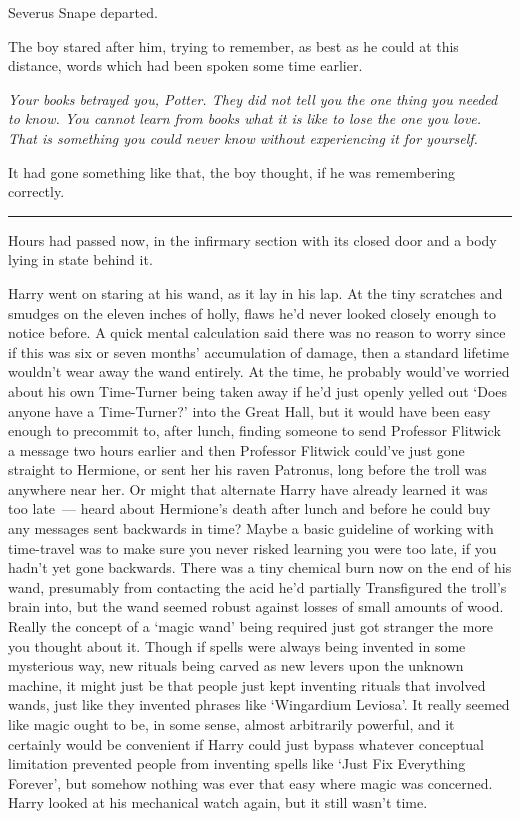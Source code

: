 Severus Snape departed.

The boy stared after him, trying to remember, as best as he could at this distance, words which had been spoken some time earlier.

\emph{Your books betrayed you, Potter. They did not tell you the one thing you needed to know. You cannot learn from books what it is like to lose the one you love. That is something you could never know without experiencing it for yourself.}

It had gone something like that, the boy thought, if he was remembering correctly.

\begin{center}\rule{3in}{0.4pt}\end{center}

Hours had passed now, in the infirmary section with its closed door and a body lying in state behind it.

Harry went on staring at his wand, as it lay in his lap. At the tiny scratches and smudges on the eleven inches of holly, flaws he'd never looked closely enough to notice before. A quick mental calculation said there was no reason to worry since if this was six or seven months' accumulation of damage, then a standard lifetime wouldn't wear away the wand entirely. At the time, he probably would've worried about his own Time-Turner being taken away if he'd just openly yelled out `Does anyone have a Time-Turner?' into the Great Hall, but it would have been easy enough to precommit to, after lunch, finding someone to send Professor Flitwick a message two hours earlier and then Professor Flitwick could've just gone straight to Hermione, or sent her his raven Patronus, long before the troll was anywhere near her. Or might that alternate Harry have already learned it was too late~--- heard about Hermione's death after lunch and before he could buy any messages sent backwards in time? Maybe a basic guideline of working with time-travel was to make sure you never risked learning you were too late, if you hadn't yet gone backwards. There was a tiny chemical burn now on the end of his wand, presumably from contacting the acid he'd partially Transfigured the troll's brain into, but the wand seemed robust against losses of small amounts of wood. Really the concept of a `magic wand' being required just got stranger the more you thought about it. Though if spells were always being invented in some mysterious way, new rituals being carved as new levers upon the unknown machine, it might just be that people just kept inventing rituals that involved wands, just like they invented phrases like `Wingardium Leviosa'. It really seemed like magic ought to be, in some sense, almost arbitrarily powerful, and it certainly would be convenient if Harry could just bypass whatever conceptual limitation prevented people from inventing spells like `Just Fix Everything Forever', but somehow nothing was ever that easy where magic was concerned. Harry looked at his mechanical watch again, but it still wasn't time.

